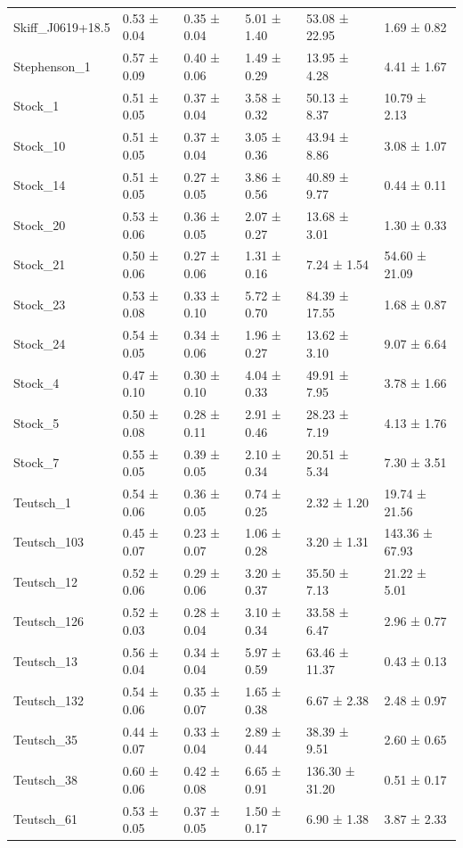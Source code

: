 \begin{tabular}{llllll}
Skiff_J0619+18.5 & 0.53 ± 0.04 & 0.35 ± 0.04 & 5.01 ± 1.40 & 53.08 ± 22.95 & 1.69 ± 0.82 \\
Stephenson_1 & 0.57 ± 0.09 & 0.40 ± 0.06 & 1.49 ± 0.29 & 13.95 ± 4.28 & 4.41 ± 1.67 \\
Stock_1 & 0.51 ± 0.05 & 0.37 ± 0.04 & 3.58 ± 0.32 & 50.13 ± 8.37 & 10.79 ± 2.13 \\
Stock_10 & 0.51 ± 0.05 & 0.37 ± 0.04 & 3.05 ± 0.36 & 43.94 ± 8.86 & 3.08 ± 1.07 \\
Stock_14 & 0.51 ± 0.05 & 0.27 ± 0.05 & 3.86 ± 0.56 & 40.89 ± 9.77 & 0.44 ± 0.11 \\
Stock_20 & 0.53 ± 0.06 & 0.36 ± 0.05 & 2.07 ± 0.27 & 13.68 ± 3.01 & 1.30 ± 0.33 \\
Stock_21 & 0.50 ± 0.06 & 0.27 ± 0.06 & 1.31 ± 0.16 & 7.24 ± 1.54 & 54.60 ± 21.09 \\
Stock_23 & 0.53 ± 0.08 & 0.33 ± 0.10 & 5.72 ± 0.70 & 84.39 ± 17.55 & 1.68 ± 0.87 \\
Stock_24 & 0.54 ± 0.05 & 0.34 ± 0.06 & 1.96 ± 0.27 & 13.62 ± 3.10 & 9.07 ± 6.64 \\
Stock_4 & 0.47 ± 0.10 & 0.30 ± 0.10 & 4.04 ± 0.33 & 49.91 ± 7.95 & 3.78 ± 1.66 \\
Stock_5 & 0.50 ± 0.08 & 0.28 ± 0.11 & 2.91 ± 0.46 & 28.23 ± 7.19 & 4.13 ± 1.76 \\
Stock_7 & 0.55 ± 0.05 & 0.39 ± 0.05 & 2.10 ± 0.34 & 20.51 ± 5.34 & 7.30 ± 3.51 \\
Teutsch_1 & 0.54 ± 0.06 & 0.36 ± 0.05 & 0.74 ± 0.25 & 2.32 ± 1.20 & 19.74 ± 21.56 \\
Teutsch_103 & 0.45 ± 0.07 & 0.23 ± 0.07 & 1.06 ± 0.28 & 3.20 ± 1.31 & 143.36 ± 67.93 \\
Teutsch_12 & 0.52 ± 0.06 & 0.29 ± 0.06 & 3.20 ± 0.37 & 35.50 ± 7.13 & 21.22 ± 5.01 \\
Teutsch_126 & 0.52 ± 0.03 & 0.28 ± 0.04 & 3.10 ± 0.34 & 33.58 ± 6.47 & 2.96 ± 0.77 \\
Teutsch_13 & 0.56 ± 0.04 & 0.34 ± 0.04 & 5.97 ± 0.59 & 63.46 ± 11.37 & 0.43 ± 0.13 \\
Teutsch_132 & 0.54 ± 0.06 & 0.35 ± 0.07 & 1.65 ± 0.38 & 6.67 ± 2.38 & 2.48 ± 0.97 \\
Teutsch_35 & 0.44 ± 0.07 & 0.33 ± 0.04 & 2.89 ± 0.44 & 38.39 ± 9.51 & 2.60 ± 0.65 \\
Teutsch_38 & 0.60 ± 0.06 & 0.42 ± 0.08 & 6.65 ± 0.91 & 136.30 ± 31.20 & 0.51 ± 0.17 \\
Teutsch_61 & 0.53 ± 0.05 & 0.37 ± 0.05 & 1.50 ± 0.17 & 6.90 ± 1.38 & 3.87 ± 2.33 \\

\end{tabular}
